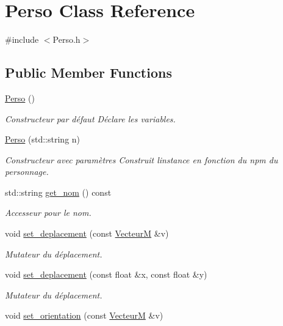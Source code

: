 \hypertarget{classPerso}{}\section{Perso Class Reference}
\label{classPerso}


{\ttfamily \#include $<$Perso.\+h$>$}

\subsection*{Public Member Functions}
\begin{DoxyCompactItemize}
\item 
\hyperlink{classPerso_a33aebfa5c1b957d87f81da39536121e8}{Perso} ()
\begin{DoxyCompactList}\small\item\em Constructeur par défaut Déclare les variables. \end{DoxyCompactList}\item 
\hyperlink{classPerso_a25afa33fb28da6526c48cca6d96cb65c}{Perso} (std\+::string n)
\begin{DoxyCompactList}\small\item\em Constructeur avec paramètres Construit l\textquotesingle{}instance en fonction du npm du personnage. \end{DoxyCompactList}\item 
std\+::string \hyperlink{classPerso_a33d916b6f92b8dace29b86ef42b55de0}{get\+\_\+nom} () const 
\begin{DoxyCompactList}\small\item\em Accesseur pour le nom. \end{DoxyCompactList}\item 
void \hyperlink{classPerso_aee94c6fa0d07ebe5d27207aa11552a22}{set\+\_\+deplacement} (const \hyperlink{classVecteurM}{VecteurM} \&v)
\begin{DoxyCompactList}\small\item\em Mutateur du déplacement. \end{DoxyCompactList}\item 
void \hyperlink{classPerso_a37854611430566f2c7443daa67cc9acb}{set\+\_\+deplacement} (const float \&x, const float \&y)
\begin{DoxyCompactList}\small\item\em Mutateur du déplacement. \end{DoxyCompactList}\item 
void \hyperlink{classPerso_abd42a00f2f2110cadc68001e570ae3f7}{set\+\_\+orientation} (const \hyperlink{classVecteurM}{VecteurM} \&v)

\end{DoxyCompactItemize}
